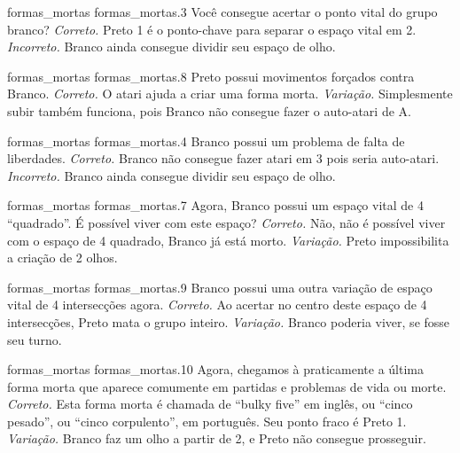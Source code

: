 \problemAnswerDiagram
  {formas_mortas}
  {formas_mortas.3}
  {Você consegue acertar o ponto vital do grupo branco?}
  {\emph{Correto.} Preto 1 é o ponto-chave para separar o espaço vital em 2.}
  {\emph{Incorreto.} Branco ainda consegue dividir seu espaço de olho.}

\problemAnswerDiagram
  {formas_mortas}
  {formas_mortas.8}
  {Preto possui movimentos forçados contra Branco.}
  {\emph{Correto.} O atari ajuda a criar uma forma morta.}
  {\emph{Variação.} Simplesmente subir também funciona, pois Branco não consegue fazer o auto-atari de A.}

\problemAnswerDiagram
  {formas_mortas}
  {formas_mortas.4}
  {Branco possui um problema de falta de liberdades.}
  {\emph{Correto.} Branco não consegue fazer atari em 3 pois seria auto-atari.}
  {\emph{Incorreto.} Branco ainda consegue dividir seu espaço de olho.}

\problemAnswerDiagram
  {formas_mortas}
  {formas_mortas.7}
  {Agora, Branco possui um espaço vital de 4 ``quadrado''. É possível viver com este espaço?}
  {\emph{Correto.} Não, não é possível viver com o espaço de 4 quadrado, Branco já está morto.}
  {\emph{Variação.} Preto impossibilita a criação de 2 olhos.}

\problemAnswerDiagram
  {formas_mortas}
  {formas_mortas.9}
  {Branco possui uma outra variação de espaço vital de 4 intersecções agora.}
  {\emph{Correto.} Ao acertar no centro deste espaço de 4 intersecções, Preto mata o grupo inteiro.}
  {\emph{Variação.} Branco poderia viver, se fosse seu turno.}

\problemAnswerDiagram
  {formas_mortas}
  {formas_mortas.10}
  {Agora, chegamos à praticamente a última forma morta que aparece comumente em partidas e problemas de vida ou morte.}
  {\emph{Correto.} Esta forma morta é chamada de ``bulky five'' em inglês, ou ``cinco pesado'', ou ``cinco corpulento'', em português. Seu ponto fraco é Preto 1.}
  {\emph{Variação.} Branco faz um olho a partir de 2, e Preto não consegue prosseguir.}
